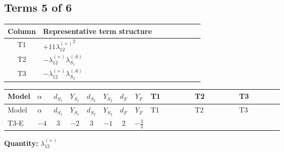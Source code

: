 \documentclass[8pt]{article}
\begin{document}
\begin{landscape}
\subsection*{Terms 5 of 6}
\begin{center}
\begin{tabular}{@{}c >{\raggedright\arraybackslash}p{0.82\linewidth}@{}}
\toprule
Column & Representative term structure \\
\midrule
T1 & \(\displaystyle +11 {\lambda_{12}^{(\times)}}^2\) \\
\midrule
T2 & \(\displaystyle -{\lambda_{12}^{(\times)}} {\lambda_{S_1}^{(A)}}\) \\
\midrule
T3 & \(\displaystyle -{\lambda_{12}^{(\times)}} {\lambda_{S_2}^{(A)}}\) \\
\midrule
\bottomrule
\end{tabular}
\end{center}
\smallskip
\tiny
\begin{longtable}{@{}llcccccc >{\raggedright\arraybackslash}p{0.21\linewidth} >{\raggedright\arraybackslash}p{0.21\linewidth} >{\raggedright\arraybackslash}p{0.21\linewidth}@{}}
\toprule
Model & $\alpha$ & $d_{S_1}$ & $Y_{S_1}$ & $d_{S_2}$ & $Y_{S_2}$ & $d_F$ & $Y_F$ & T1 & T2 & T3 \\
\midrule
\endfirsthead
\toprule
Model & $\alpha$ & $d_{S_1}$ & $Y_{S_1}$ & $d_{S_2}$ & $Y_{S_2}$ & $d_F$ & $Y_F$ & T1 & T2 & T3 \\
\midrule
\endhead
T3-E & $-4$ & $3$ & $-2$ & $3$ & $-1$ & $2$ & $-\frac{3}{2}$ & \scriptsize\adjustbox{max width=\linewidth}{$\begin{gathered} +11 {\lambda_{12}^{(\times)}}^2\end{gathered}$} & \scriptsize\adjustbox{max width=\linewidth}{$\begin{gathered} -{\lambda_{12}^{(\times)}} {\lambda_{S_1}^{(A)}}\end{gathered}$} & \scriptsize\adjustbox{max width=\linewidth}{$\begin{gathered} -{\lambda_{12}^{(\times)}} {\lambda_{S_2}^{(A)}}\end{gathered}$} \\
\midrule
\bottomrule
\end{longtable}
\clearpage
\noindent\textbf{Quantity: }$\lambda_{12}^{(\times)}$\par\smallskip

\end{landscape}
\end{document}

